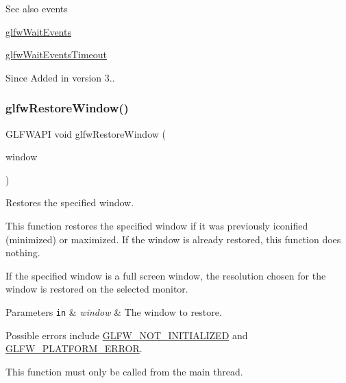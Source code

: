 \begin{DoxySeeAlso}{See also}
events 

\hyperlink{group__window_ga6e042d05823c11e11c7339b81a237738}{glfw\+Wait\+Events} 

\hyperlink{group__window_ga05223a0a4c5e50f10f289e60398153aa}{glfw\+Wait\+Events\+Timeout}
\end{DoxySeeAlso}
\begin{DoxySince}{Since}
Added in version 3.. 
\end{DoxySince}
\mbox{\label{group__window_ga1e29caf0b819f578b04db52fff17256c}} 
\subsubsection{\texorpdfstring{glfw\+Restore\+Window()}{glfwRestoreWindow()}}
{\footnotesize\ttfamily G\+L\+F\+W\+A\+PI void glfw\+Restore\+Window (\begin{DoxyParamCaption}\item[{\hyperlink{group__window_ga3c96d80d363e67d13a41b5d1821f3242}{G\+L\+F\+Wwindow} $\ast$}]{window }\end{DoxyParamCaption})}



Restores the specified window. 

This function restores the specified window if it was previously iconified (minimized) or maximized. If the window is already restored, this function does nothing.

If the specified window is a full screen window, the resolution chosen for the window is restored on the selected monitor.


\begin{DoxyParams}[1]{Parameters}
\mbox{\tt in}  & {\em window} & The window to restore.\\
\hline
\end{DoxyParams}
Possible errors include \hyperlink{group__errors_ga2374ee02c177f12e1fa76ff3ed15e14a}{G\+L\+F\+W\+\_\+\+N\+O\+T\+\_\+\+I\+N\+I\+T\+I\+A\+L\+I\+Z\+ED} and \hyperlink{group__errors_gad44162d78100ea5e87cdd38426b8c7a1}{G\+L\+F\+W\+\_\+\+P\+L\+A\+T\+F\+O\+R\+M\+\_\+\+E\+R\+R\+OR}.

This function must only be called from the main thread.

